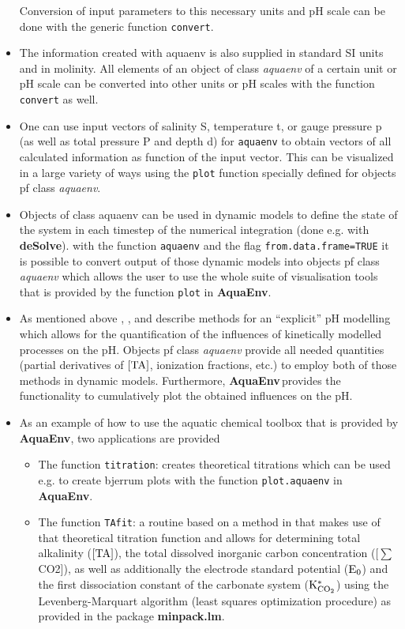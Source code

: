 \documentclass[article,nojss]{jss}
\newcommand{\aq}{\textbf{\textsf{AquaEnv}}}
\newcommand{\lm}{\textbf{\textsf{minpack.lm}}}
\newcommand{\R}{\proglang{R }}
\newcommand{\ds}{\textbf{\textsf{deSolve}}}
\begin{document}
\begin{itemize}
Conversion of input parameters to this necessary units and pH scale  can be done with the generic function \texttt{convert}.
\item The information created with aquaenv is also supplied in standard SI units and in molinity. All elements of an object of class \textit{aquaenv} of a certain unit or pH scale
can be converted into other units or pH scales with the function \texttt{convert} as well.
\item One can use input vectors of salinity S, temperature t, or gauge pressure p (as well as total pressure P and depth d) for \texttt{aquaenv} to obtain vectors of all calculated information as function of 
the input vector. This can be visualized in a large variety of ways using the \texttt{plot} function specially defined for objects pf class \textit{aquaenv}.
\item  Objects of class aquaenv can be used in dynamic models to define the state of the system in each timestep of the numerical integration (done e.g. with \ds).
with the function \texttt{aquaenv} and the flag \texttt{from.data.frame=TRUE} it is possible to convert output of those dynamic models into objects pf class
\textit{aquaenv} which allows the user to use the whole suite of visualisation tools that is provided by the function \texttt{plot} in \aq.
\item As mentioned above \cite{Hofmann2008}, \cite{Hofmann2009}, and \cite{Hofmann2008c} describe methods for an ``explicit'' pH modelling which allows 
for the quantification of the influences of kinetically modelled processes on the pH. Objects pf class \textit{aquaenv} provide all needed quantities 
(partial derivatives of $\rm[TA]$, ionization fractions, etc.) to employ both of those methods in dynamic models. 
Furthermore, \aq$\,$provides the functionality to cumulatively plot the obtained influences on the pH.
\item As an example of how to use the aquatic chemical toolbox that is provided by \aq, two applications are provided
\begin{itemize}
\item The function \texttt{titration}: creates theoretical titrations which can be used e.g. to create bjerrum plots with the function \texttt{plot.aquaenv} in \aq.
\item The function \texttt{TAfit}:  a routine based on a method in \cite{DOE1994} that makes use of that theoretical titration function and allows for 
determining  total alkalinity ($\rm [TA]$),  the total dissolved inorganic carbon concentration ([$\sum$CO2]), as well as additionally the electrode standard potential ($\rm E_0$) and the first dissociation 
constant of the carbonate system ($\rm K^*_{CO_2}$) using the Levenberg-Marquart algorithm (least squares optimization procedure) as provided in the \R package \lm.
\end{itemize}
\end{itemize}
\end{document}
